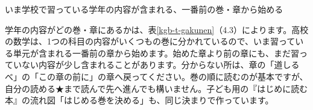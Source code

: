 \begin{taisetsu}
いま学校で習っている学年の内容が含まれる、一番前の巻・章から始める
\end{taisetsu}

学年の内容がどの巻・章にあるかは、表\ref{kgb-t-gakunen}（4.3）によります。高校の数学は、1つの科目の内容がいくつもの巻に分かれているので、いま習っている単元が含まれる一番前の章から始めます。始めた章より前の章にも、まだ習っていない内容が少し含まれることがあります。分からない所は、章の「道しるべ」の「この章の前に」の章へ戻ってください。巻の順に読むのが基本ですが、自分の読める★まで読んで先へ進んでも構いません。子ども用の『はじめに読む本』の流れ図「はじめる巻を決める」も、同じ決まりで作っています。

\par\addvspace{4pt}
